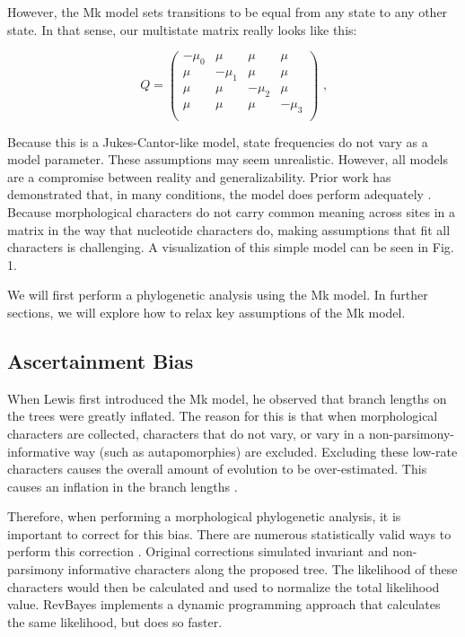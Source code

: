 However, the Mk model sets transitions to be equal from any state to any other state. 
In that sense, our multistate matrix really looks like this:

\begin{equation*}
Q = \begin{pmatrix} -\mu_0 & \mu & \mu & \mu \\
\mu & -\mu_1  & \mu & \mu \\
\mu & \mu & -\mu_2  & \mu \\
\mu & \mu & \mu & -\mu_3 \\
\end{pmatrix} \mbox{  ,}
\end{equation*}

Because this is a Jukes-Cantor-like model, state frequencies do not vary as a model parameter.
These assumptions may seem unrealistic.
However, all models are a compromise between reality and generalizability.
Prior work has demonstrated that, in many conditions, the model does perform adequately \citep{wright14}.
Because morphological characters do not carry common meaning across sites in a matrix in the way that nucleotide characters do, making assumptions that fit all characters is challenging. 
A visualization of this simple model can be seen in Fig. 1.\par

We will first perform a phylogenetic analysis using the Mk model.
In further sections, we will explore how to relax key assumptions of the Mk model. \par

\subsection{Ascertainment Bias}

When Lewis first introduced the Mk model, he observed that branch lengths on the trees were greatly inflated.
The reason for this is that when morphological characters are collected, characters that do not vary, or vary in a non-parsimony-informative way (such as autapomorphies) are excluded.
Excluding these low-rate characters causes the overall amount of evolution to be over-estimated.
This causes an inflation in the branch lengths \cite{lewis01}.
\par

Therefore, when performing a morphological phylogenetic analysis, it is important to correct for this bias.
There are numerous statistically valid ways to perform this correction \cite{allman08b}.
Original corrections simulated invariant and non-parsimony informative characters along the proposed tree.
The likelihood of these characters would then be calculated and used to normalize the total likelihood value.
RevBayes implements a dynamic programming approach that calculates the same likelihood, but  does so faster. \par

